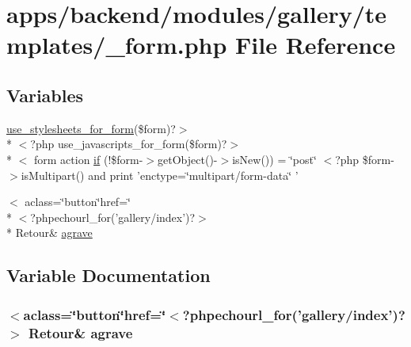 \hypertarget{backend_2modules_2gallery_2templates_2__form_8php}{\section{apps/backend/modules/gallery/templates/\-\_\-form.php File Reference}
\label{backend_2modules_2gallery_2templates_2__form_8php}
}
\subsection*{Variables}
\begin{DoxyCompactItemize}
\item 
\hyperlink{live_2modules_2user_2templates_2__form_8php_a86bc4522fdbe625b07bc4a4d6eec3df7}{use\-\_\-stylesheets\-\_\-for\-\_\-form}(\$form)?$>$\\*
$<$?php use\-\_\-javascripts\-\_\-for\-\_\-form(\$form)?$>$\\*
$<$ form action \hyperlink{backend_2modules_2gallery_2templates_2__form_8php_abd1acf0179bbb4a56e04d4fccdbc121f}{if} (!\$form-\/$>$get\-Object()-\/$>$is\-New()) = \char`\"{}post\char`\"{} $<$?php \$form-\/$>$is\-Multipart() and print 'enctype=\char`\"{}multipart/form-\/data\char`\"{} '
\item 
$<$ aclass=\char`\"{}button\char`\"{}href=\char`\"{}\\*
$<$?phpechourl\-\_\-for('gallery/index')?$>$\\*
 Retour\& \hyperlink{backend_2modules_2gallery_2templates_2__form_8php_a0697cd905b863e594b3ab4c1f530b8c7}{agrave}
\end{DoxyCompactItemize}


\subsection{Variable Documentation}
\hypertarget{backend_2modules_2gallery_2templates_2__form_8php_a0697cd905b863e594b3ab4c1f530b8c7}{
\subsubsection[{agrave}]{\setlength{\rightskip}{0pt plus 5cm}$<$aclass=\char`\"{}button\char`\"{}href=\char`\"{}$<$?phpechourl\-\_\-for('gallery/index')?$>$ Retour\& agrave}}\label{backend_2modules_2gallery_2templates_2__form_8php_a0697cd905b863e594b3ab4c1f530b8c7}


